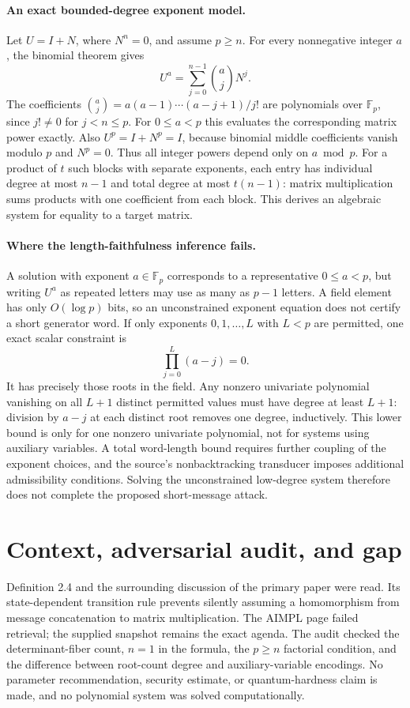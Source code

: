 \documentclass[11pt]{article}
\begin{document}
\paragraph{An exact bounded-degree exponent model.}
Let $U=I+N$, where $N^n=0$, and assume $p\ge n$. For every nonnegative
integer $a$, the binomial theorem gives
\[
U^a=\sum_{j=0}^{n-1}\binom aj N^j.
\]
The coefficients $\binom aj=a(a-1)\cdots(a-j+1)/j!$ are polynomials over
$\mathbb F_p$, since $j!\ne0$ for $j<n\le p$.
For $0\le a<p$ this evaluates the corresponding matrix power exactly.
Also $U^p=I+N^p=I$, because binomial middle coefficients vanish modulo $p$
and $N^p=0$. Thus all integer powers depend only on $a\bmod p$.
For a product of $t$ such blocks with separate exponents, each entry has
individual degree at most $n-1$ and total degree at most $t(n-1)$:
matrix multiplication sums products with one coefficient from each block.
This derives an algebraic system for equality to a target matrix.

\paragraph{Where the length-faithfulness inference fails.}
A solution with exponent $a\in\mathbb F_p$ corresponds to a representative
$0\le a<p$, but writing $U^a$ as repeated letters may use as many as $p-1$
letters. A field element has only $O(\log p)$ bits, so an unconstrained
exponent equation does not certify a short generator word. If only exponents
$0,1,\ldots,L$ with $L<p$ are permitted, one exact scalar constraint is
\[
\prod_{j=0}^{L}(a-j)=0.
\]
It has precisely those roots in the field. Any nonzero univariate polynomial
vanishing on all $L+1$ distinct permitted values must have degree at least
$L+1$: division by $a-j$ at each distinct root removes one degree, inductively.
This lower bound is only for one nonzero univariate polynomial, not for systems
using auxiliary variables. A total word-length bound requires further coupling
of the exponent choices, and the source's nonbacktracking transducer imposes
additional admissibility conditions. Solving the unconstrained low-degree
system therefore does not complete the proposed short-message attack.

\section{Context, adversarial audit, and gap}
Definition 2.4 and the surrounding discussion of the primary paper were read.
Its state-dependent transition rule prevents silently assuming a homomorphism
from message concatenation to matrix multiplication. The AIMPL page failed
retrieval; the supplied snapshot remains the exact agenda. The audit checked
the determinant-fiber count, $n=1$ in the formula, the $p\ge n$ factorial
condition, and the difference between root-count degree and auxiliary-variable
encodings. No parameter recommendation, security estimate, or quantum-hardness
claim is made, and no polynomial system was solved computationally.
\end{document}

